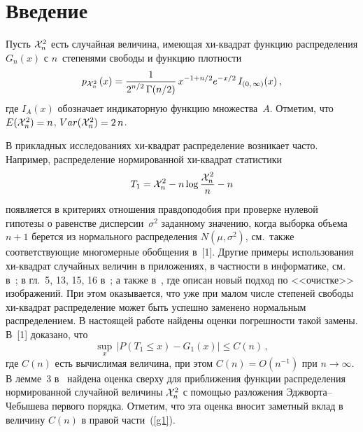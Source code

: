       \begin{multicols}{2}
      
            \label{st\stat}

\section{Введение}

Пусть ${\cal X}_n^2$ есть случайная величина, имеющая хи-квад\-рат функцию распределения   $G_n(x)$ с 
$n$~степенями свободы  и функцию плотности
\begin{equation*}
p_{{\cal X}_n^2}\,(x) =
\displaystyle\frac{\displaystyle 1\mathstrut}{\displaystyle 2^{n/2}\,\Gamma(n/2)\mathstrut} \, x^{-1+n/2}  e^{-x/2}\,I_{(0,\,\infty)}(x)\,,
\end{equation*}
где $I_A(x)$ обозначает индикаторную функцию множества~$A$. Отметим, что
$ E({\cal X}_n^2) = n $,  $ Var({\cal X}_n^2) =2\,n$.

\smallskip

В прикладных исследованиях   хи-квад\-рат распределение возникает часто. 
Например, распределение нормированной хи-квад\-рат статистики
\begin{equation*}
T_1 = {\cal X}^2_n - n \log \displaystyle\frac{\displaystyle {\cal X}^2_n\mathstrut}{\displaystyle n\mathstrut} - n
\end{equation*}
появляется в критериях отношения правдоподобия при проверке нулевой гипотезы  о равенстве дисперсии~$\sigma^2$ 
заданному значению, когда выборка объема $n+1$  берется из нормального распределения  $N(\mu, \sigma^2)$, 
см.\ также соответствующие многомерные обобщения в~[1]. Другие примеры использования хи-квад\-рат 
случайных величин в приложениях, в частности  в информатике, см. в~\cite{9-cr}; в гл.~5, 13, 15, 16 в~\cite{2-cr}; 
а также в~\cite{10-cr}, где описан новый подход по <<очистке>> изображений. При этом оказывается, 
что уже при  малом числе степеней свободы хи-квад\-рат распределение может быть успешно заменено 
нормальным распределением. В настоящей работе найдены оценки погрешности такой замены. 
В~[1] доказано, что
\begin{equation}
\label{g1}
\sup_x\,|P (T_1 \leq x) - G_1 (x)| \leq C(n)\,,
\end{equation}
где  $C(n)$ есть вычислимая величина, при этом  $C(n) = O(n^{-1})$ при
$n \rightarrow\infty$. В лемме~3 в~\cite{1-cr}
найдена оценка сверху для приближения функции распределения нормированной случайной величины ${\cal X}_n^2$ с 
помощью разложения Эджворта--Чебышева первого порядка. Отметим, что эта оценка вносит заметный вклад в величину
 $C(n)$  в правой части~(\ref{g1}).
 

\end{multicols}
